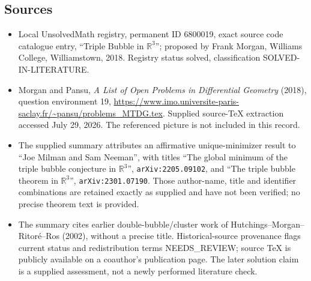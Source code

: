 \documentclass[11pt]{article}
\newcommand{\R}{\mathbb{R}}
\begin{document}
\subsection{Sources}
\begin{itemize}
\item Local UnsolvedMath registry, permanent ID 6800019, exact source code catalogue entry, ``Triple Bubble in $\R^3$''; proposed by Frank Morgan, Williams College, Williamstown, 2018. Registry status solved, classification SOLVED-IN-LITERATURE.
\item Morgan and Pansu, \emph{A List of Open Problems in Differential Geometry} (2018), question environment 19, \url{https://www.imo.universite-paris-saclay.fr/~pansu/problems_MTDG.tex}. Supplied source-TeX extraction accessed July 29, 2026. The referenced picture is not included in this record.
\item The supplied summary attributes an affirmative unique-minimizer result to ``Joe Milman and Sam Neeman'', with titles ``The global minimum of the triple bubble conjecture in $\R^3$'', \texttt{arXiv:2205.09102}, and ``The triple bubble theorem in $\R^3$'', \texttt{arXiv:2301.07190}. Those author-name, title and identifier combinations are retained exactly as supplied and have not been verified; no precise theorem text is provided.
\item The summary cites earlier double-bubble/cluster work of Hutchings--Morgan--Ritor\'e--Ros (2002), without a precise title. Historical-source provenance flags current status and redistribution terms NEEDS\_REVIEW; source TeX is publicly available on a coauthor's publication page. The later solution claim is a supplied assessment, not a newly performed literature check.
\end{itemize}
\end{document}
